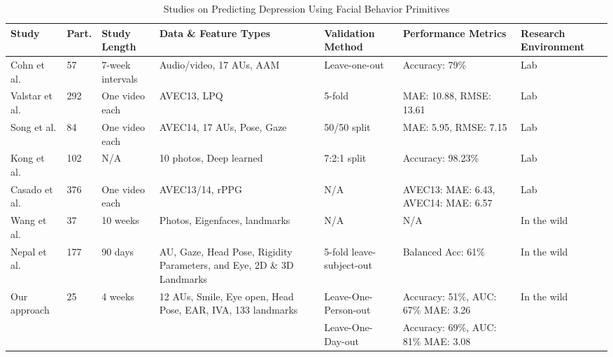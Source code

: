 \begin{table}[h]
\caption{\label{tab:background}Studies on Predicting Depression Using Facial Behavior Primitives}
\centering  
\tiny

\begin{tabular}{p{1.5cm}p{.5cm}p{1.5cm}p{3cm}p{1.5cm}p{2cm}p{1.3cm}}
\toprule
\textbf{Study} & \textbf{Part.} & \textbf{Study Length} & \textbf{Data \& Feature Types} & \textbf{Validation Method} & \textbf{Performance Metrics} & \textbf{Research Environment} \\
\midrule

Cohn et al. \cite{cohn2009detecting} & 57 & 7-week intervals & Audio/video, 17 AUs, AAM & Leave-one-out & Accuracy: 79\% & Lab \\

Valstar et al. \cite{valstar2013avec} & 292 & One video each & AVEC13, LPQ & 5-fold & MAE: 10.88, \newline RMSE: 13.61 & Lab \\

Song et al. \cite{song2020spectral} & 84 & One video each & AVEC14, 17 AUs, Pose, Gaze & 50/50 split & MAE: 5.95, \newline RMSE: 7.15 & Lab \\

Kong et al. \cite{kong2022automatic} & 102 & N/A & 10 photos, Deep learned & 7:2:1 split & Accuracy: 98.23\% & Lab \\

Casado et al. \cite{casado2023depression} & 376 & One video each & AVEC13/14, rPPG & N/A & AVEC13: MAE: 6.43, \newline AVEC14: MAE: 6.57 & Lab \\

Wang et al. \cite{wang2015using} & 37 & 10 weeks & Photos, Eigenfaces, landmarks & N/A & N/A & In the wild \\


Nepal et al. \cite{nepal2024moodcapture} & 177 & 90 days & AU, Gaze, Head Pose, Rigidity Parameters, and Eye, 2D \& 3D Landmarks & 5-fold leave-subject-out & Balanced Acc: 61\% & In the wild \\


Our approach & 25 & 4 weeks & 12 AUs, Smile, Eye open, Head Pose, EAR, IVA, 133 landmarks & Leave-One-Person-out & Accuracy: 51\%, \newline AUC: 67\% \newline MAE: 3.26 & In the wild \\
 &  &  &  & Leave-One-Day-out & Accuracy: 69\%, \newline AUC: 81\% \newline MAE: 3.08 &  \\
\bottomrule
\end{tabular}
\end{table}

